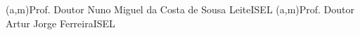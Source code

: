 

\ncmember(a,m){Prof. Doutor Nuno Miguel da Costa de Sousa Leite}{ISEL} 
\ncmember(a,m){Prof. Doutor Artur Jorge Ferreira}{ISEL}





